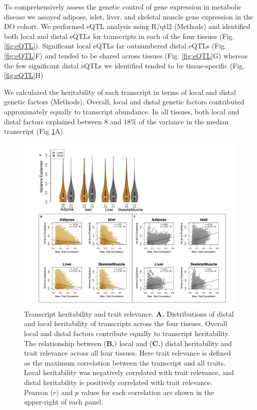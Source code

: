 \documentclass[
]{article}
\begin{document}
To comprehensively assess the genetic control of gene expression in
metabolic disease we assayed adipose, islet, liver, and skeletal muscle
gene expression in the DO cohort. We performed eQTL analysis using
R/qtl2 \cite{pmid30591514} (Methods) and identified both local and
distal eQTLs for transcripts in each of the four tissues (Fig.
\ref{fig:eQTL}). Significant local eQTLs far outnumbered distal eQTLs
(Fig. \ref{fig:eQTL}F) and tended to be shared across tissues (Fig.
\ref{fig:eQTL}G) whereas the few significant distal eQTLs we identified
tended to be tissue-specific (Fig. \ref{fig:eQTL}H)

We calculated the heritability of each transcript in terms of local and
distal genetic factors (Methods). Overall, local and distal genetic
factors contributed approximately equally to transcript abundance. In
all tissues, both local and distal factors explained between 8 and 18\%
of the variance in the median transcript (Fig \ref{fig:motivation}A).

\begin{figure}[ht!]
\includegraphics[width=\textwidth]{Figures/Fig2_motivation.pdf} 
\caption{Transcript heritability and trait relevance. 
\textbf{A.} Distributions of distal and local heritability of 
transcripts across the four tissues. Overall local and distal 
factors contribute equally to transcript heritability. The 
relationship between (\textbf{B.}) local and (\textbf{C.}) 
distal heritability and trait relevance across all four tissues. 
Here trait relevance is defined as the maximum correlation between 
the transcript and all traits. Local heritability was negatively 
correlated with trait relevance, and distal heritability is 
positively correlated with trait relevance. Pearson ($r$) and $p$ 
values for each correlation are shown in the upper-right of each panel.}
\label{fig:motivation}
\end{figure}
\end{document}
